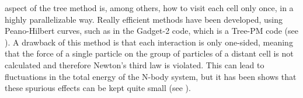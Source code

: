 \begin{itemize}
aspect of the tree method is, among others, how to visit each cell
only once, in a highly parallelizable way. Really efficient methods
have been developed, using Peano-Hilbert curves, such as in the Gadget-2
code, which is a Tree-PM code (see \cite{springel_cosmological_2005}).
A drawback of this method is that each interaction is only one-sided,
meaning that the force of a single particle on the group of particles
of a distant cell is not calculated and therefore Newton's third law
is violated. This can lead to fluctuations in the total energy of
the N-body system, but it has been shows that these spurious effects
can be kept quite small (see \citet{dehnen_n-body_2011}). 
\end{itemize}

